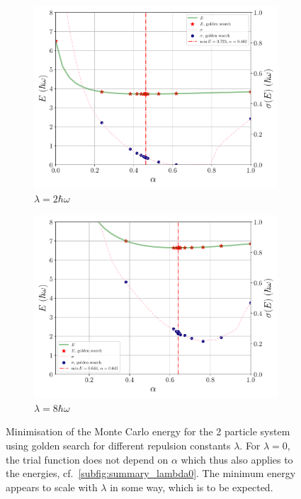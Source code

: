 \documentclass[a4paper,DIV=12,english]{scrartcl}
\begin{document}
\begin{figure}
    \begin{subfigure}{0.49\textwidth}
        \centering
        \includegraphics[width=\textwidth]{../plots/summary/summary_2d_lambda2.pdf}
        \caption{$\lambda=2\hbar\omega$}
        \label{subfig:summary_lambda2}
    \end{subfigure}
    \begin{subfigure}{0.49\textwidth}
        \centering
        \includegraphics[width=\textwidth]{../plots/summary/summary_2d_lambda8.pdf}
        \caption{$\lambda=8\hbar\omega$}
        \label{subfig:summary_lambda8}
    \end{subfigure}
    \caption{Minimisation of the Monte Carlo energy for the 2 particle system using golden search for different repulsion constants $\lambda$. For $\lambda=0$, the trial function does not depend on $\alpha$ which thus also applies to the energies, cf.~\ref{subfig:summary_lambda0}. The minimum energy appears to scale with $\lambda$ in some way, which is to be expected.}
    \label{fig:summary_2d}
\end{figure}
\end{document}
